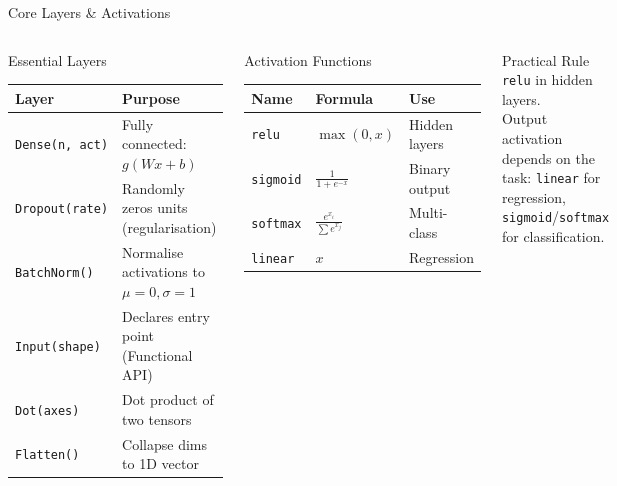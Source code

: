\documentclass[aspectratio=169, 11pt]{beamer}
\begin{document}
\begin{frame}{Core Layers \& Activations}

\begin{columns}[T]
\begin{block}{\small Essential Layers}
\footnotesize
\renewcommand{\arraystretch}{1.15}
\begin{tabular}{@{}lp{4.5cm}@{}}
\toprule
\textbf{Layer} & \textbf{Purpose} \\
\midrule
\texttt{Dense(n, act)} & Fully connected: $g(Wx{+}b)$ \\
\texttt{Dropout(rate)} & Randomly zeros units (regularisation) \\
\texttt{BatchNorm()} & Normalise activations to $\mu{=}0,\sigma{=}1$ \\
\texttt{Input(shape)} & Declares entry point (Functional API) \\
\texttt{Dot(axes)} & Dot product of two tensors \\
\texttt{Flatten()} & Collapse dims to 1D vector \\
\bottomrule
\end{tabular}
\end{block}

\begin{block}{\small Activation Functions}
\footnotesize
\renewcommand{\arraystretch}{1.15}
\begin{tabular}{@{}llp{2cm}@{}}
\toprule
\textbf{Name} & \textbf{Formula} & \textbf{Use} \\
\midrule
\texttt{relu} & $\max(0,x)$ & Hidden layers \\
\texttt{sigmoid} & $\frac{1}{1+e^{-x}}$ & Binary output \\
\texttt{softmax} & $\frac{e^{x_i}}{\sum e^{x_j}}$ & Multi-class \\
\texttt{linear} & $x$ & Regression \\
\bottomrule
\end{tabular}
\end{block}

\vspace{0.15cm}

\begin{exampleblock}{\small Practical Rule}
\footnotesize
\texttt{relu} in hidden layers.\\ Output activation depends on the task: \texttt{linear} for regression, \texttt{sigmoid}/\texttt{softmax} for classification.
\end{exampleblock}
\end{columns}

\end{frame}
\end{document}
